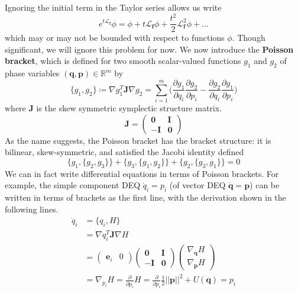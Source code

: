       Ignoring the initial term in the Taylor series allows us write 
      \begin{equation}
        e^{t \mathcal{L}_\mathbf{f}} \phi = \phi + t \mathcal{L}_\mathbf{f} \phi + \frac{t^2}{2} \mathcal{L}_\mathbf{f}^2 \phi + \ldots
      \end{equation}
      which may or may not be bounded with respect to functions $\phi$. Though significant, we will ignore this problem for now. We now introduce the \textbf{Poisson bracket}, which is defined for two smooth scalar-valued functions $g_1$ and $g_2$ of phase variables $(\mathbf{q}, \mathbf{p}) \in \mathbb{R}^m$ by 
      \begin{equation}
        \{g_1, g_2\} \coloneqq \nabla g_1^T \mathbf{J} \nabla g_2 = \sum_{i=1}^m \bigg( \frac{\partial g_1}{\partial q_i} \frac{\partial g_2}{\partial p_i} - \frac{ \partial g_2}{\partial q_i} \frac{\partial g_1}{\partial p_i} \bigg)
      \end{equation}
      where $\mathbf{J}$ is the skew symmetric symplectic structure matrix.
      \begin{equation}
        \mathbf{J} = \begin{pmatrix} \mathbf{0} & \mathbf{I} \\ -\mathbf{I} & \mathbf{0} \end{pmatrix}
      \end{equation}
      As the name suggests, the Poisson bracket has the bracket structure: it is bilinear, skew-symmetric, and satisfied the Jacobi identity defined 
      \begin{equation}
        \{ g_1, \{g_2, g_3\} \} + \{g_3, \{ g_1, g_2\}\} + \{g_2, \{g_3, g_1\}\} = 0
      \end{equation}
      We can in fact write differential equations in terms of Poisson brackets. For example, the simple component DEQ $\dot{q}_i = p_i$ (of vector DEQ $\mathbf{\dot{q}} = \mathbf{p}$) can be written in terms of brackets as the first line, with the derivation shown in the following lines. 
      \begin{align*}
        \dot{q}_i & = \{q_i, H\} \\
        & = \nabla q_i^T \mathbf{J} \nabla H \\
        & = \begin{pmatrix}
        \mathbf{e}_i & 0 
        \end{pmatrix} \begin{pmatrix}
        \mathbf{0} & \mathbf{I} \\ -\mathbf{I} & \mathbf{0} 
        \end{pmatrix} \begin{pmatrix}
        \nabla_\mathbf{q} H \\ \nabla_\mathbf{p} H 
        \end{pmatrix} \\
        & = \nabla_{p_i} H = \frac{\partial}{\partial p_i} H = \frac{\partial}{\partial p_i} \frac{1}{2} ||\mathbf{p}||^2 + U(\mathbf{q}) = p_i
      \end{align*}
